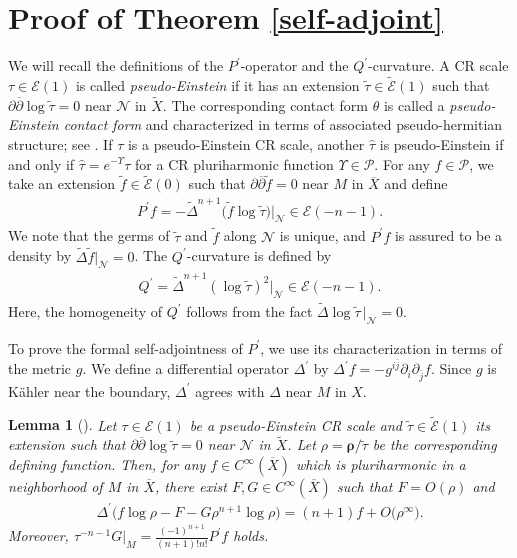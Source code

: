 \documentclass[pdftex]{sigma}
\numberwithin{equation}{section}
\newtheorem{Lemma}[Theorem]{Lemma}
\begin{document}
\section{Proof of Theorem \ref{self-adjoint}}
We will recall the def\/initions of the $P^\prime$-operator and the $Q^\prime$-curvature. A CR scale $\tau\in\mathcal{E}(1)$ is called {\it pseudo-Einstein} if it has an extension $\widetilde\tau
\in\widetilde{\mathcal{E}}(1)$ such that $\partial\overline{\partial}\log\widetilde\tau=0$ near $\mathcal{N}$ in $\widetilde X$. The corresponding contact form $\theta$ is called a {\it pseudo-Einstein contact form} and characterized in terms of associated pseudo-hermitian structure; see \cite{Hirachi, Hirachi/Marugame/Matsumoto, Lee}. If $\tau$ is a pseudo-Einstein CR scale, another $\widehat\tau$ is pseudo-Einstein if and only if $\widehat\tau=e^{-\Upsilon}\tau$ for a CR pluriharmonic function $\Upsilon\in\mathcal{P}$. For any $f\in\mathcal{P}$, we take an extension
$\widetilde f\in\widetilde{\mathcal{E}}(0)$ such that $\partial\overline{\partial}\widetilde f=0$ near $M$ in $\overline X$ and def\/ine
\begin{gather*}
P^\prime f=-\widetilde\Delta^{n+1}\big(\widetilde f\log\widetilde\tau\big)|_\mathcal{N}\in\mathcal{E}(-n-1).
\end{gather*}
We note that the germs of $\widetilde\tau$ and $\widetilde f$ along $\mathcal{N}$ is unique, and $P^\prime f$ is assured to be a density by $\widetilde\Delta \widetilde f|_\mathcal{N}=0$. The $Q^\prime$-curvature is def\/ined by
\begin{gather*}
Q^\prime=\widetilde\Delta^{n+1}(\log\widetilde\tau)^2 |_\mathcal{N}\in\mathcal{E}(-n-1).
\end{gather*}
Here, the homogeneity of $Q^\prime$ follows from the fact $\widetilde\Delta\log\widetilde\tau\,|_\mathcal{N}=0$.

To prove the formal self-adjointness of $P^\prime$, we use its characterization in terms of the metric $g$. We def\/ine a dif\/ferential operator $\Delta^\prime$ by $\Delta^\prime f
=-g^{i\overline{j}}\partial_i\partial_{\overline{j}}f$. Since $g$ is K\"ahler near the boundary, $\Delta^\prime$ agrees with $\Delta$ near $M$ in $X$.

\begin{Lemma}[{\cite[Lemma 4.4]{Hirachi}}]\label{Delta}
Let $\tau\in\mathcal{E}(1)$ be a pseudo-Einstein CR scale and $\widetilde\tau\in\widetilde{\mathcal{E}}(1)$ its extension such that $\partial\overline{\partial}\log\widetilde\tau=0$ near $\mathcal{N}$ in $\widetilde X$. Let $\rho=\boldsymbol\rho/\widetilde\tau$ be the corresponding defining function. Then, for any $f\in C^\infty(\overline X)$ which is pluriharmonic in a neighborhood of $M$ in $\overline X$, there exist $F, G\in C^\infty(\overline X)$ such that $F=O(\rho)$ and
\begin{gather*}
\Delta^\prime \big(f\log\rho-F-G\rho^{n+1}\log\rho\big)=(n+1)f+O\big(\rho^\infty\big).
\end{gather*}
Moreover, ${\tau}^{-n-1}G|_M=\frac{(-1)^{n+1}}{(n+1)!n!}P^\prime f$ holds.
\end{Lemma}
\end{document}
